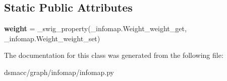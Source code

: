 \subsection*{Static Public Attributes}
\begin{DoxyCompactItemize}
\item 
\mbox{\label{classdsmacc_1_1graph_1_1infomap_1_1infomap_1_1Weight_af8a2fc71da155de0165a2aded894583b}} 
{\bfseries weight} = \+\_\+swig\+\_\+property(\+\_\+infomap.\+Weight\+\_\+weight\+\_\+get, \+\_\+infomap.\+Weight\+\_\+weight\+\_\+set)
\end{DoxyCompactItemize}


The documentation for this class was generated from the following file\+:\begin{DoxyCompactItemize}
\item 
dsmacc/graph/infomap/infomap.\+py\end{DoxyCompactItemize}
